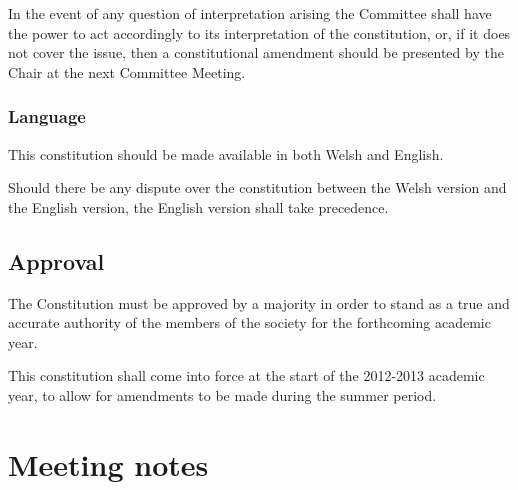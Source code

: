 \documentclass{report}
\begin{document}
In the event of any question of interpretation arising the Committee shall have the power to act accordingly to its interpretation of the constitution, or, if it does not cover the issue, then a constitutional amendment should be presented by the Chair at the next Committee Meeting.

	\subsection{Language}
	
	This constitution should be made available in both Welsh and English.
	
	Should there be any dispute over the constitution between the Welsh version and the English version, the English version shall take precedence.

\section{Approval}

The Constitution must be approved by a majority in order to stand as a true and accurate authority of the members of the society for the forthcoming academic year.

This constitution shall come into force at the start of the 2012-2013 academic year, to allow for amendments to be made during the summer period.

\appendix
\chapter{Meeting notes}
\label{meeting_notes}
\end{document}
